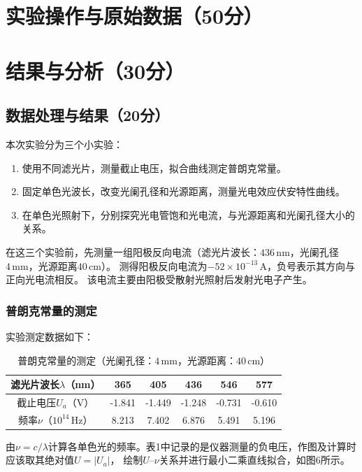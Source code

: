 \documentclass[10pt,a4paper]{ctexart} %
\begin{document}
\section{实验操作与原始数据（50分）}

\section{结果与分析（30分）}

  \subsection{数据处理与结果（20分）}
  本次实验分为三个小实验：
  \begin{enumerate}
    \item 使用不同滤光片，测量截止电压，拟合曲线测定普朗克常量。
    \item 固定单色光波长，改变光阑孔径和光源距离，测量光电效应伏安特性曲线。
    \item 在单色光照射下，分别探究光电管饱和光电流，与光源距离和光阑孔径大小的关系。
  \end{enumerate}

  在这三个实验前，先测量一组阳极反向电流（滤光片波长：$436\,\mathrm{nm}$，光阑孔径$4\,\mathrm{mm}$，光源距离$40\,\mathrm{cm}$）。
  测得阳极反向电流为$-52\times10^{-13}\,\mathrm{A}$，负号表示其方向与正向光电流相反。
  该电流主要由阳极受散射光照射后发射光电子产生。

  \subsubsection{普朗克常量的测定}
    实验测定数据如下：

    \begin{table}[H]
      \centering
      \caption{普朗克常量的测定（光阑孔径：$4\,\mathrm{mm}$，光源距离：$40\,\mathrm{cm}$）}
      \begin{tabular}{cccccc}
        \toprule
        滤光片波长$\lambda$（nm） & 365 & 405 & 436 & 546 & 577 \\
        \midrule
        截止电压$U_a$（V） & -1.841 & -1.449 & -1.248 & -0.731 & -0.610 \\
        频率$\nu$（$10^{14}\,\mathrm{Hz}$） & 8.213 & 7.402 & 6.876 & 5.491 & 5.196 \\
        \bottomrule
      \end{tabular}
    \end{table}

    由$\nu=c/\lambda$计算各单色光的频率。表1中记录的是仪器测量的负电压，作图及计算时应该取其绝对值$U=|U_a|$，
    绘制$U$--$\nu$关系并进行最小二乘直线拟合，如图6所示。
\end{document}
